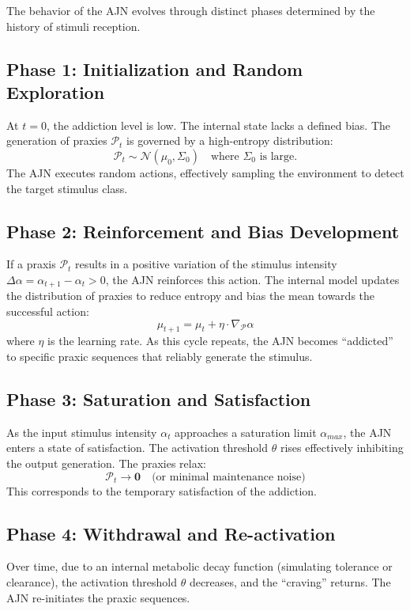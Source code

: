 \documentclass[12pt,a4paper]{article}
\begin{document}
The behavior of the AJN evolves through distinct phases determined by the history of stimuli reception.

\subsection{Phase 1: Initialization and Random Exploration}
At $t=0$, the addiction level is low. The internal state lacks a defined bias. The generation of praxies $\mathcal{P}_t$ is governed by a high-entropy distribution:
\[
\mathcal{P}_t \sim \mathcal{N}(\mu_0, \Sigma_0) \quad \text{where } \Sigma_0 \text{ is large.}
\]
The AJN executes random actions, effectively sampling the environment to detect the target stimulus class.

\subsection{Phase 2: Reinforcement and Bias Development}
If a praxis $\mathcal{P}_t$ results in a positive variation of the stimulus intensity $\Delta \alpha = \alpha_{t+1} - \alpha_t > 0$, the AJN reinforces this action. The internal model updates the distribution of praxies to reduce entropy and bias the mean towards the successful action:
\[
\mu_{t+1} = \mu_t + \eta \cdot \nabla_{\mathcal{P}} \alpha
\]
where $\eta$ is the learning rate. As this cycle repeats, the AJN becomes ``addicted'' to specific praxic sequences that reliably generate the stimulus.

\subsection{Phase 3: Saturation and Satisfaction}
As the input stimulus intensity $\alpha_t$ approaches a saturation limit $\alpha_{max}$, the AJN enters a state of satisfaction. The activation threshold $\theta$ rises effectively inhibiting the output generation. The praxies relax:
\[
\mathcal{P}_t \to \mathbf{0} \quad \text{(or minimal maintenance noise)}
\]
This corresponds to the temporary satisfaction of the addiction.

\subsection{Phase 4: Withdrawal and Re-activation}
Over time, due to an internal metabolic decay function (simulating tolerance or clearance), the activation threshold $\theta$ decreases, and the ``craving'' returns. The AJN re-initiates the praxic sequences.
\end{document}

